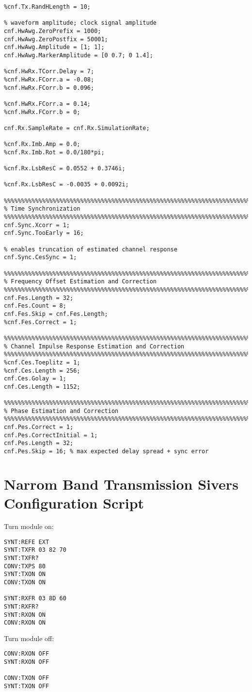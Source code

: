\begin{appendix}
\begin{verbatim}
%cnf.Tx.RandHLength = 10;

% waveform amplitude; clock signal amplitude
cnf.HwAwg.ZeroPrefix = 1000;
cnf.HwAwg.ZeroPostfix = 50001;
cnf.HwAwg.Amplitude = [1; 1];
cnf.HwAwg.MarkerAmplitude = [0 0.7; 0 1.4];

%cnf.HwRx.TCorr.Delay = 7;
%cnf.HwRx.FCorr.a = -0.08;
%cnf.HwRx.FCorr.b = 0.096;

%cnf.HwRx.FCorr.a = 0.14;
%cnf.HwRx.FCorr.b = 0;

cnf.Rx.SampleRate = cnf.Rx.SimulationRate;

%cnf.Rx.Imb.Amp = 0.0;
%cnf.Rx.Imb.Rot = 0.0/180*pi;

%cnf.Rx.LsbResC = 0.0552 + 0.3746i;

%cnf.Rx.LsbResC = -0.0035 + 0.0092i;

%%%%%%%%%%%%%%%%%%%%%%%%%%%%%%%%%%%%%%%%%%%%%%%%%%%%%%%%%%%%%%%%%%%%%%%%%%%%%%%%
% Time Synchronization
%%%%%%%%%%%%%%%%%%%%%%%%%%%%%%%%%%%%%%%%%%%%%%%%%%%%%%%%%%%%%%%%%%%%%%%%%%%%%%%%
cnf.Sync.Xcorr = 1;
cnf.Sync.TooEarly = 16;

% enables truncation of estimated channel response
cnf.Sync.CesSync = 1;

%%%%%%%%%%%%%%%%%%%%%%%%%%%%%%%%%%%%%%%%%%%%%%%%%%%%%%%%%%%%%%%%%%%%%%%%%%%%%%%%
% Frequency Offset Estimation and Correction
%%%%%%%%%%%%%%%%%%%%%%%%%%%%%%%%%%%%%%%%%%%%%%%%%%%%%%%%%%%%%%%%%%%%%%%%%%%%%%%%
cnf.Fes.Length = 32;
cnf.Fes.Count = 8;
cnf.Fes.Skip = cnf.Fes.Length;
%cnf.Fes.Correct = 1;

%%%%%%%%%%%%%%%%%%%%%%%%%%%%%%%%%%%%%%%%%%%%%%%%%%%%%%%%%%%%%%%%%%%%%%%%%%%%%%%%
% Channel Impulse Response Estimation and Correction
%%%%%%%%%%%%%%%%%%%%%%%%%%%%%%%%%%%%%%%%%%%%%%%%%%%%%%%%%%%%%%%%%%%%%%%%%%%%%%%%
%cnf.Ces.Toeplitz = 1;
%cnf.Ces.Length = 256;
cnf.Ces.Golay = 1;
cnf.Ces.Length = 1152;

%%%%%%%%%%%%%%%%%%%%%%%%%%%%%%%%%%%%%%%%%%%%%%%%%%%%%%%%%%%%%%%%%%%%%%%%%%%%%%%%
% Phase Estimation and Correction
%%%%%%%%%%%%%%%%%%%%%%%%%%%%%%%%%%%%%%%%%%%%%%%%%%%%%%%%%%%%%%%%%%%%%%%%%%%%%%%%
cnf.Pes.Correct = 1;
cnf.Pes.CorrectInitial = 1;
cnf.Pes.Length = 32;
cnf.Pes.Skip = 16; % max expected delay spread + sync error
\end{verbatim}

\chapter{Narrom Band Transmission Sivers Configuration Script}
\label{app:res_450_sivers_on}
Turn module on:

\begin{verbatim}
SYNT:REFE EXT
SYNT:TXFR 03 82 70
SYNT:TXFR?
CONV:TXPS 80
SYNT:TXON ON
CONV:TXON ON

SYNT:RXFR 03 8D 60
SYNT:RXFR?
SYNT:RXON ON
CONV:RXON ON
\end{verbatim}

Turn module off:
\begin{verbatim}
CONV:RXON OFF
SYNT:RXON OFF

CONV:TXON OFF
SYNT:TXON OFF
\end{verbatim}

\end{appendix}
